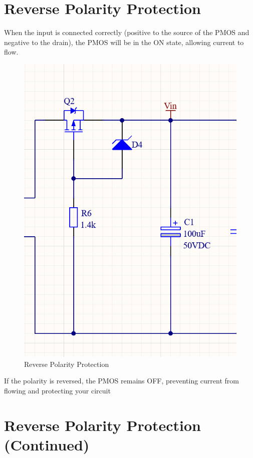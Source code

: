 \documentclass{article}
\begin{document}
\section*{Reverse Polarity Protection}

When the input is connected correctly (positive to the source of the PMOS and negative to the drain), the PMOS will be in the ON state, allowing current to flow.

\begin{figure}[htbp]
    \centering
    \includegraphics[width=\textwidth]{RVP.png}
    \caption{Reverse Polarity Protection}
    \label{fig:RVP}
\end{figure}
 If the polarity is reversed, the PMOS remains OFF, preventing current from flowing and protecting your circuit
\section*{Reverse Polarity Protection (Continued)}
\end{document}
